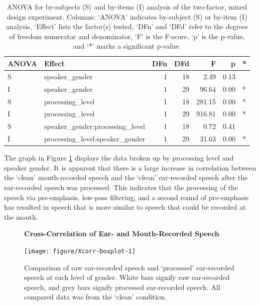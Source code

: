 \begin{table}[ht]
\centering
\begin{tabular}{llrrrrl}
  \hline
ANOVA & Effect & DFn & DFd & F & p & * \\ 
  \hline
S & speaker\_gender & 1 & 18 & 2.49 & 0.13 &  \\ 
  I & speaker\_gender & 1 & 29 & 96.64 & 0.00 & * \\ 
  S & processing\_level & 1 & 18 & 281.15 & 0.00 & * \\ 
  I & processing\_level & 1 & 29 & 916.81 & 0.00 & * \\ 
  S & speaker\_gender:processing\_level & 1 & 18 & 0.72 & 0.41 &  \\ 
  I & processing\_level:speaker\_gender & 1 & 29 & 31.63 & 0.00 & * \\ 
   \hline
\end{tabular}
\caption{ANOVA for by-subjects (S) and by-items (I) analysis of the two-factor, mixed design experiment. Columns: `ANOVA' indicates by-subject (S) or by-item (I) analysis, `Effect' lists the factor(s) tested, `DFn' and `DFd' refer to the degrees of freedom numerator and denominator, `F' is the F-score, `p' is the p-value, and `*' marks a significant p-value.} 
\label{tab:anova_data-collection}
\end{table}


The graph in Figure \ref{fig:data-collection-viz} displays the data broken up by processing level and speaker gender.  It is apparent that there is a large increase in correlation between the `clean' mouth-recorded speech and the `clean' ear-recorded speech after the ear-recorded speech was processed.  This indicates that the processing of the speech via pre-emphasis, low-pass filtering, and a second round of pre-emphasis has resulted in speech that is more similar to speech that could be recorded at the mouth.

\begin{figure}[H]
\centering
\textbf{Cross-Correlation of Ear- and Mouth-Recorded Speech}

\texttt{[image: figure/Xcorr-boxplot-1]} 

\caption{Comparison of raw ear-recorded speech and `processed' ear-recorded speech at each level of gender.  White bars signify raw ear-recorded speech, and grey bars signify processed ear-recorded speech. All compared data was from the `clean' condition.}\label{fig:data-collection-viz}
\end{figure}

